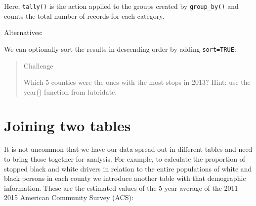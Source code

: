 \documentclass[]{book}
\newenvironment{Shaded}{\begin{snugshade}}{\end{snugshade}}
\newcommand{\KeywordTok}[1]{\textcolor[rgb]{0.13,0.29,0.53}{\textbf{#1}}}
\newcommand{\DataTypeTok}[1]{\textcolor[rgb]{0.13,0.29,0.53}{#1}}
\newcommand{\StringTok}[1]{\textcolor[rgb]{0.31,0.60,0.02}{#1}}
\newcommand{\CommentTok}[1]{\textcolor[rgb]{0.56,0.35,0.01}{\textit{#1}}}
\newcommand{\OtherTok}[1]{\textcolor[rgb]{0.56,0.35,0.01}{#1}}
\newcommand{\OperatorTok}[1]{\textcolor[rgb]{0.81,0.36,0.00}{\textbf{#1}}}
\newcommand{\NormalTok}[1]{#1}
\theoremstyle{definition}
\theoremstyle{definition}
\theoremstyle{definition}
\theoremstyle{remark}
\begin{document}
Here, \texttt{tally()} is the action applied to the groups created by
\texttt{group\_by()} and counts the total number of records for each
category.

Alternatives:

\begin{Shaded}
\end{Shaded}

We can optionally sort the results in descending order by adding
\texttt{sort=TRUE}:

\begin{Shaded}
\end{Shaded}

\begin{quote}
Challenge

Which 5 counties were the ones with the most stops in 2013? Hint: use
the year() function from lubridate.
\end{quote}

\section{Joining two tables}\label{joining-two-tables}

It is not uncommon that we have our data spread out in different tables
and need to bring those together for analysis. For example, to calculate
the proportion of stopped black and white drivers in relation to the
entire populations of white and black persons in each county we
introduce another table with that demographic information. These are the
estimated values of the 5 year average of the 2011-2015 American
Community Survey (ACS):
\end{document}
